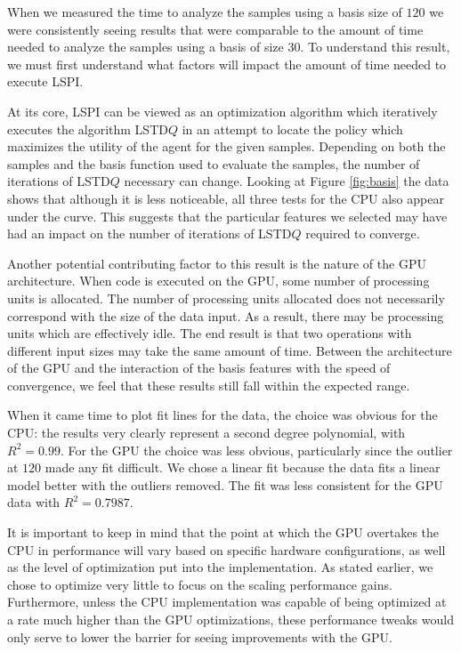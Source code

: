 When we measured the time to analyze the samples using a basis size of $120$ we were consistently seeing results that were comparable to the amount of time needed to analyze the samples using a basis of size $30$. To understand this result, we must first understand what factors will impact the amount of time needed to execute LSPI.

At its core, LSPI can be viewed as an optimization algorithm which iteratively executes the algorithm LSTD$Q$ in an attempt to locate the policy which maximizes the utility of the agent for the given samples. Depending on both the samples and the basis function used to evaluate the samples, the number of iterations of LSTD$Q$ necessary can change. Looking at Figure \ref{fig:basis} the data shows that although it is less noticeable, all three tests for the CPU also appear under the curve. This suggests that the particular features we selected may have had an impact on the number of iterations of LSTD$Q$ required to converge.

Another potential contributing factor to this result is the nature of the GPU architecture. When code is executed on the GPU, some number of processing units is allocated. The number of processing units allocated does not necessarily correspond with the size of the data input. As a result, there may be processing units which are effectively idle. The end result is that two operations with different input sizes may take the same amount of time. Between the architecture of the GPU and the interaction of the basis features with the speed of convergence, we feel that these results still fall within the expected range.

When it came time to plot fit lines for the data, the choice was obvious for the CPU: the results very clearly represent a second degree polynomial, with $R^2 = 0.99$. For the GPU the choice was less obvious, particularly since the outlier at $120$ made any fit difficult. We chose a linear fit because the data fits a linear model better with the outliers removed. The fit was less consistent for the GPU data with $R^2 = 0.7987$.

It is important to keep in mind that the point at which the GPU overtakes the CPU in performance will vary based on specific hardware configurations, as well as the level of optimization put into the implementation. As stated earlier, we chose to optimize very little to focus on the scaling performance gains. Furthermore, unless the CPU implementation was capable of being optimized at a rate much higher than the GPU optimizations, these performance tweaks would only serve to lower the barrier for seeing improvements with the GPU.

